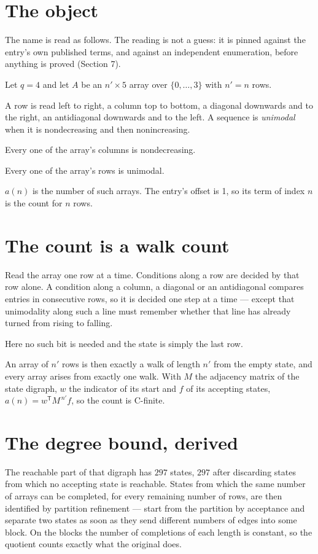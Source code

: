 \documentclass[11pt]{article}
\theoremstyle{definition}
\begin{document}
\section{The object}

The name is read as follows. The reading is not a guess: it is pinned against the entry's own published terms, and against an independent enumeration, before anything is proved (Section 7).

Let $q = 4$ and let $A$ be an $n' \times 5$ array over $\{0,\dots,3\}$ with $n' = n$ rows.

A row is read left to right, a column top to bottom, a diagonal downwards and to the right, an antidiagonal downwards and to the left. A sequence is {\itshape unimodal} when it is nondecreasing and then nonincreasing.

Every one of the array's columns is nondecreasing.

Every one of the array's rows is unimodal.

$a(n)$ is the number of such arrays. The entry's offset is 1, so its term of index $n$ is the count for $n$ rows.

\section{The count is a walk count}

Read the array one row at a time. Conditions along a row are decided by that row alone. A condition along a column, a diagonal or an antidiagonal compares entries in consecutive rows, so it is decided one step at a time --- except that unimodality along such a line must remember whether that line has already turned from rising to falling.

Here no such bit is needed and the state is simply the last row.

An array of $n'$ rows is then exactly a walk of length $n'$ from the empty state, and every array arises from exactly one walk. With $M$ the adjacency matrix of the state digraph, $w$ the indicator of its start and $f$ of its accepting states, $a(n) = w^{\mathsf T}M^{\,n'}f$, so the count is C-finite.

\section{The degree bound, derived}

The reachable part of that digraph has $297$ states, $297$ after discarding states from which no accepting state is reachable. States from which the same number of arrays can be completed, for every remaining number of rows, are then identified by partition refinement --- start from the partition by acceptance and separate two states as soon as they send different numbers of edges into some block. On the blocks the number of completions of each length is constant, so the quotient counts exactly what the original does.
\end{document}

